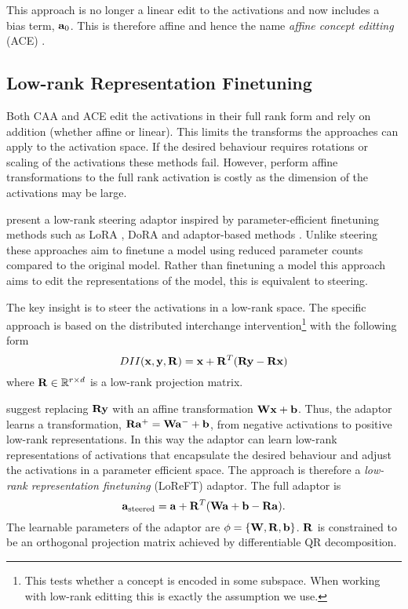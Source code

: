This approach is no longer a linear edit to the activations and now includes a bias term, $\mathbf{a}_0$.
This is therefore affine and hence the name \textit{affine concept editting} (ACE) \cite{ace}.

\subsection{Low-rank Representation Finetuning}
\label{loreft}

Both CAA \cite{caa} and ACE \cite{ace} edit the activations in their full rank form and rely on addition (whether affine or linear).
This limits the transforms the approaches can apply to the activation space.
If the desired behaviour requires rotations or scaling of the activations these methods fail.
However, perform affine transformations to the full rank activation is costly as the dimension of the activations may be large.

\citet{reft} present a low-rank steering adaptor inspired by parameter-efficient finetuning methods such as LoRA \cite{lora}, DoRA \cite{dora} and adaptor-based methods \cite{petl}.
Unlike steering these approaches aim to finetune a model using reduced parameter counts compared to the original model.
Rather than finetuning a model this approach aims to edit the representations of the model, this is equivalent to steering.

The key insight is to steer the activations in a low-rank space.
The specific approach is based on the distributed interchange intervention\footnote{This tests whether a concept is encoded in some subspace. When working with low-rank editting this is exactly the assumption we use.} \cite{dii} with the following form
\begin{equation*}
    DII(\mathbf{x},\mathbf{y},\mathbf{R}) = \mathbf{x} + \mathbf{R}^T(\mathbf{R}\mathbf{y} - \mathbf{R}\mathbf{x})
\end{equation*}
where $\mathbf{R} \in \mathbb{R}^{r\times d}$ is a low-rank projection matrix.

\citet{reft} suggest replacing $\mathbf{R}\mathbf{y}$ with an affine transformation $\mathbf{W}\mathbf{x} + \mathbf{b}$.
Thus, the adaptor learns a transformation, $\mathbf{R}\mathbf{a}^+ = \mathbf{W}\mathbf{a}^- + \mathbf{b}$, from negative activations to positive low-rank representations.
In this way the adaptor can learn low-rank representations of activations that encapsulate the desired behaviour and adjust the activations in a parameter efficient space.
The approach is therefore a \textit{low-rank representation finetuning} (LoReFT) adaptor.
The full adaptor is
\begin{equation}
    \label{eq:loreft}
    \mathbf{a}_\text{steered} = \mathbf{a} + \mathbf{R}^T(\mathbf{W}\mathbf{a} + \mathbf{b} - \mathbf{R}\mathbf{a}).
\end{equation}
The learnable parameters of the adaptor are $\phi = \{\mathbf{W}, \mathbf{R}, \mathbf{b}\}$.
$\mathbf{R}$ is constrained to be an orthogonal projection matrix achieved by differentiable QR decomposition.

